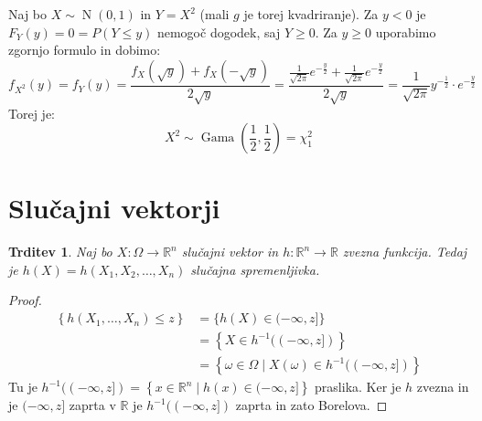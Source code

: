 \documentclass[12pt]{book}
\theoremstyle{definition}
\theoremstyle{plain}
\theoremstyle{plain}
\newtheorem{trditev}{Trditev}
\theoremstyle{plain}
\theoremstyle{plain}
\theoremstyle{remark}
\begin{document}
\begin{zgled}
    Naj bo $X \sim \operatorname{N}(0, 1)$ in $Y = X^2$ (mali $g$ je torej kvadriranje). Za $y<0$ je $F_Y(y)=0=P(Y \leq y)$ nemogoč dogodek, saj $Y \geq 0$. Za $y \geq 0$ uporabimo zgornjo formulo in dobimo: 
    $$
    f_{X^2}(y) = f_Y(y) = \frac{f_X(\sqrt{y})+f_X(-\sqrt{y})}{2 \sqrt{y}} =\frac{\frac{1}{\sqrt{2 \pi}}e^{-\frac{y}{2}} + \frac{1}{\sqrt{2 \pi}}e^{-\frac{y}{2}}}{2 \sqrt{y}} =\frac{1}{\sqrt{2 \pi}} y^{-\frac{1}{2}} \cdot e^{-\frac{y}{2}}
    $$
    Torej je: 
    $$
    X^2 \sim \operatorname{Gama}\left(\frac{1}{2}, \frac{1}{2}\right)=\chi_1^2 
    $$
\end{zgled}

\section{Slučajni vektorji}

\begin{trditev}
    Naj bo $X: \Omega \rightarrow \mathbb{R}^n$ slučajni vektor in $h: \mathbb{R}^n \rightarrow \mathbb{R}$ zvezna funkcija. Tedaj je $h(X)=h\left(X_1, X_2, \ldots, X_n\right)$ slučajna spremenljivka.
\end{trditev}

\begin{proof}
    $$
    \begin{aligned}
        \left\{h\left(X_1, \ldots, X_n\right) \leq z\right\}&=\{h(X) \in(-\infty, z]\} \\
        &= \left\{X \in h^{-1}((-\infty, z])\right\} \\
        &= \left\{\omega \in \Omega \mid X(\omega) \in h^{-1}((-\infty, z])\right\}
    \end{aligned}
    $$
    Tu je $h^{-1}((-\infty, z])=\left\{x\in \mathbb{R}^n \mid h(x) \in(-\infty, z]\right\}$ praslika. Ker je $h$ zvezna in je $(-\infty, z]$ zaprta v $\mathbb{R}$ je $h^{-1}((-\infty, z])$ zaprta in zato Borelova.
\end{proof}
\end{document}
